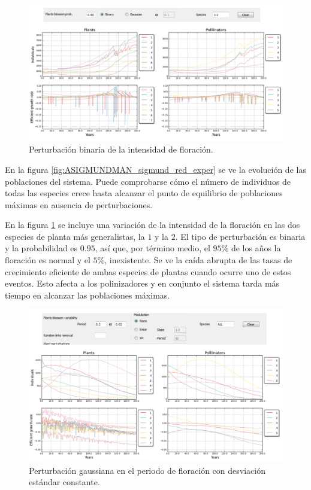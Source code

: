 \begin{figure}[h!]
\centering
\includegraphics[scale=1]{ManFigs/sigmund_oscilacion_intensidad.png}
\caption{Perturbación binaria de la intensidad de floración.}
\label{fig:ASIGMUNDMAN_sigmund_oscilacion_intensidad}
\end{figure}

En la figura \ref{fig:ASIGMUNDMAN_sigmund_red_exper} se ve la evolución de las poblaciones del sistema. Puede comprobarse cómo el número de individuos de todas las especies crece hasta alcanzar el punto de equilibrio de poblaciones máximas en ausencia de perturbaciones. 

En la figura \ref{fig:ASIGMUNDMAN_sigmund_oscilacion_intensidad} se incluye una variación de la intensidad de la floración en las dos especies de planta más generalistas, la $1$ y la $2$. El tipo de perturbación es binaria y la probabilidad es $0.95$, así que, por término medio, el $95\%$ de los años la floración es normal y el $5\%$, inexistente. Se ve la caída abrupta de las tasas
de crecimiento eficiente de ambas especies de plantas cuando ocurre uno de estos eventos. Esto afecta a los polinizadores y en conjunto el sistema tarda más tiempo en alcanzar las poblaciones máximas.

\begin{figure}[h!]
\centering
\includegraphics[scale=1]{ManFigs/sigmund_oscilacion_tiempo_none.png}
\caption{Perturbación gaussiana en el periodo de floración con desviación estándar constante.}
\label{fig:ASIGMUNDMAN_sigmund_oscilacion_tiempo_none}
\end{figure}


